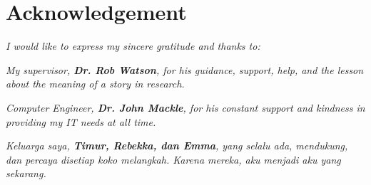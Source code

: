 \newpage
\centering
\section*{Acknowledgement} 

\vspace{6cm}
\textit{I would like to express my sincere gratitude and thanks to:}

\vspace{1cm}

\textit{My supervisor, \textbf{Dr. Rob Watson}, for his guidance, support, help, and the lesson about the meaning of a story in research.}

\textit{Computer Engineer, \textbf{Dr. John Mackle}, for his constant support and kindness in providing my IT needs at all time.}

\textit{Keluarga saya, \textbf{Timur, Rebekka, dan Emma}, yang selalu ada, mendukung, dan percaya disetiap koko melangkah. Karena mereka, aku menjadi aku yang sekarang.}





